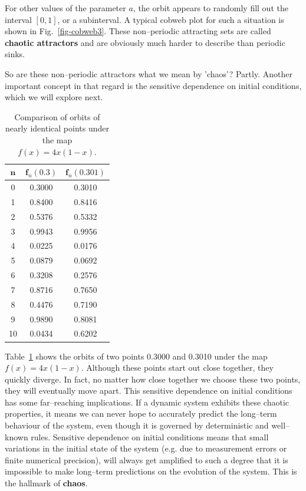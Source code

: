 For other values of the parameter $a$, the orbit appears to randomly fill out the interval $[0,1]$, or a subinterval. A typical cobweb plot for such a situation is shown in Fig.~\ref{fig-cobweb3}. These non--periodic attracting sets are called \textbf{chaotic attractors} and are obviously much harder to describe than periodic sinks.


So are these non--periodic attractors what we mean by 'chaos'? Partly. Another important concept in that regard is the sensitive dependence on initial conditions, which we will explore next.

\pagebreak


\begin{table}
\centering
\begin{tabular}{|c|c|c|}
\hline
${\mathbf n}$  & ${\mathbf f_n(0.3)}$ & ${\mathbf f_n(0.301)}$  \\
\hline
0  & 0.3000 & 0.3010  \\
\hline
1  & 0.8400 & 0.8416 \\
\hline
2  & 0.5376 & 0.5332 \\
\hline
3  & 0.9943 & 0.9956 \\
\hline
4  & 0.0225 & 0.0176 \\
\hline
5  & 0.0879 & 0.0692 \\
\hline
6  & 0.3208 & 0.2576 \\
\hline
7  & 0.8716 & 0.7650 \\
\hline
8  & 0.4476 & 0.7190 \\
\hline
9 & 0.9890 & 0.8081 \\
\hline
10 & 0.0434 & 0.6202 \\
\hline
\end{tabular}
\caption{Comparison of orbits of nearly identical points under the map $f(x)=4x(1-x)$.}
\label{table-sens}
\end{table}

Table~\ref{table-sens} shows the orbits of two points 0.3000 and 0.3010 under the map $f(x)=4x(1-x)$. Although these points start out close together, they quickly diverge. In fact, no matter how close together we choose these two points, they will eventually move apart. This sensitive dependence on initial conditions has some far--reaching implications. If a dynamic system exhibits these chaotic properties, it means we can never hope to accurately predict the long--term behaviour of the system, even though it is governed by deterministic and well--known rules. Sensitive dependence on initial conditions means that small variations in the initial state of the system (e.g. due to measurement errors or finite numerical precision), will always get amplified to such a degree that it is impossible to make long--term predictions on the evolution of the system. This is the hallmark of \textbf{chaos}.

